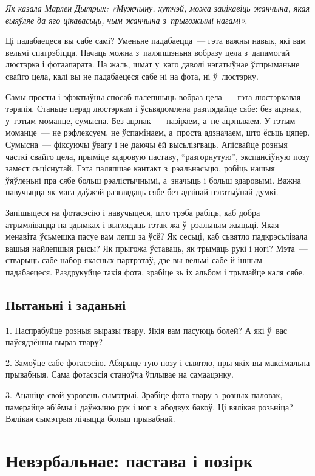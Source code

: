 \emph{Як казала Марлен Дытрых: «Мужчыну, хутчэй, можа зацікавіць жанчына, якая выяўляе да яго цікавасьць, чым жанчына з~прыгожымі нагамі».}

Ці падабаецеся вы сабе самі? Уменьне падабаецца~--- гэта важны навык, які вам вельмі спатрэбіцца. Пачаць можна з~паляпшэньня вобразу цела з~дапамогай люстэрка і фотаапарата. На жаль, шмат у~каго даволі нэгатыўнае ўспрыманьне свайго цела, калі вы не падабаецеся сабе ні на фота, ні ў~люстэрку.

Самы просты і эфэктыўны спосаб палепшыць вобраз цела~--- гэта люстэркавая тэрапія. Станьце перад люстэркам і ўсьвядомлена разглядайце сябе: без ацэнак, у~гэтым моманце, сумысна. Без ацэнак~--- назіраем, а~не ацэньваем. У гэтым моманце~--- не рэфлексуем, не ўспамінаем, а~проста адзначаем, што ёсьць цяпер. Сумысна~--- фіксуючы ўвагу і не даючы ёй высьлізгваць. Апісвайце розныя часткі свайго цела, прыміце здаровую паставу, ``разгорнутую'', экспансіўную позу замест сьціснутай. Гэта паляпшае кантакт з~рэальнасьцю, робіць нашыя ўяўленьні пра сябе больш рэалістычнымі, а~значыць і больш здаровымі. Важна навучыцца як мага даўжэй разглядаць сябе без адзінай нэгатыўнай думкі.

Запішыцеся на фотасэсію і навучыцеся, што трэба рабіць, каб добра атрымлівацца на здымках і выглядаць гэтак жа ў~рэальным жыцьці. Якая менавіта ўсьмешка пасуе вам лепш за ўсё? Як сесьці, каб сьвятло падкрэсьлівала вашыя найлепшыя рысы? Як прыгожа ўставаць, як трымаць рукі і ногі? Мэта~--- стварыць сабе набор якасных партрэтаў, дзе вы вельмі сабе й іншым падабаецеся. Раздрукуйце такія фота, зрабіце зь іх альбом і трымайце каля сябе.

\subsection*{Пытаньні і заданьні}

1. Паспрабуйце розныя выразы твару. Якія вам пасуюць болей? А які ў~вас паўсядзённы выраз твару?

2. Замоўце сабе фотасэсію. Абярыце тую позу і сьвятло, пры якіх вы максімальна прывабныя. Сама фотасэсія станоўча ўплывае на самаацэнку.

3. Ацаніце свой узровень сымэтрыі. Зрабіце фота твару з~розных паловак, памерайце аб'ёмы і даўжыню рук і ног з~абодвух бакоў. Ці вялікая розьніца? Вялікая сымэтрыя лічыцца больш прывабнай.


\section{Невэрбальнае: пастава і позірк}

